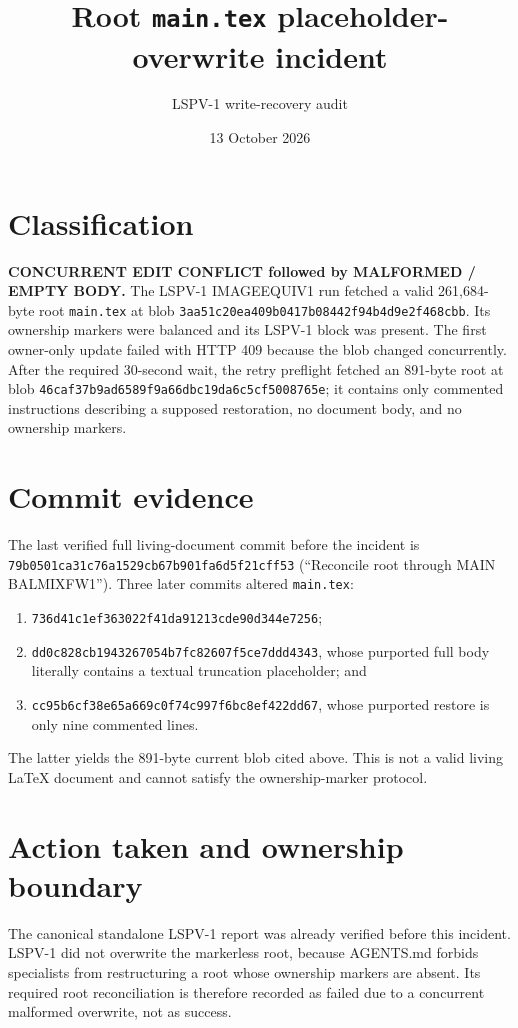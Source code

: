 \documentclass[11pt]{article}
\title{Root \texttt{main.tex} placeholder-overwrite incident}
\author{LSPV-1 write-recovery audit}
\date{13 October 2026}
\begin{document}
\sloppy
\maketitle

\section*{Classification}
\textbf{CONCURRENT EDIT CONFLICT followed by MALFORMED / EMPTY BODY.}
The LSPV-1 IMAGEEQUIV1 run fetched a valid 261,684-byte root
\texttt{main.tex} at blob
\texttt{3aa51c20ea409b0417b08442f94b4d9e2f468cbb}.  Its ownership markers were
balanced and its LSPV-1 block was present.  The first owner-only update failed
with HTTP 409 because the blob changed concurrently.  After the required
30-second wait, the retry preflight fetched an 891-byte root at blob
\texttt{46caf37b9ad6589f9a66dbc19da6c5cf5008765e}; it contains only commented
instructions describing a supposed restoration, no document body, and no
ownership markers.

\section*{Commit evidence}
The last verified full living-document commit before the incident is
\texttt{79b0501ca31c76a1529cb67b901fa6d5f21cff53}
(``Reconcile root through MAIN BALMIXFW1'').  Three later commits altered
\texttt{main.tex}:
\begin{enumerate}
\item \texttt{736d41c1ef363022f41da91213cde90d344e7256};
\item \texttt{dd0c828cb1943267054b7fc82607f5ce7ddd4343}, whose purported full body
  literally contains a textual truncation placeholder; and
\item \texttt{cc95b6cf38e65a669c0f74c997f6bc8ef422dd67}, whose purported restore is
  only nine commented lines.
\end{enumerate}
The latter yields the 891-byte current blob cited above.  This is not a valid
living LaTeX document and cannot satisfy the ownership-marker protocol.

\section*{Action taken and ownership boundary}
The canonical standalone LSPV-1 report
was already verified before this incident.  LSPV-1 did not overwrite the
markerless root, because AGENTS.md forbids specialists from restructuring a
root whose ownership markers are absent.  Its required root reconciliation is
therefore recorded as failed due to a concurrent malformed overwrite, not as
success.
\end{document}
